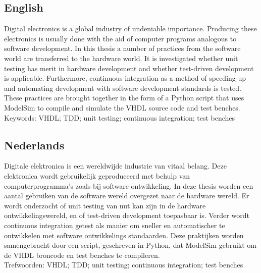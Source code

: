 \documentclass[11pt,british]{article}
\begin{document}
\subsection*{English}
Digital electronics is a global industry of undeniable importance. Producing these electronics is usually done with the aid of computer programs analogous to software development. In this thesis a number of practices from the software world are transferred to the hardware world. It is investigated whether unit testing has merit in hardware development and whether test-driven development is applicable. Furthermore, continuous integration as a method of speeding up and automating development with software development standards is tested. These practices are brought together in the form of a Python script that uses ModelSim to compile and simulate the VHDL source code and test benches.
\\[\baselineskip]
Keywords: VHDL; TDD; unit testing; continuous integration; test benches
\\[2\baselineskip]

\subsection*{Nederlands}
Digitale elektronica is een wereldwijde industrie van vitaal belang. Deze elektronica wordt gebruikelijk geproduceerd met behulp van computerprogramma's zoals bij software ontwikkeling. In deze thesis worden een aantal gebruiken van de software wereld overgezet naar de hardware wereld. Er wordt onderzocht of unit testing van nut kan zijn in de hardware ontwikkelingswereld, en of test-driven development toepasbaar is. Verder wordt continuous integration getest als manier om sneller en automatischer te ontwikkelen met software ontwikkelings standaarden. Deze praktijken worden samengebracht door een script, geschreven in Python, dat ModelSim gebruikt om de VHDL broncode en test benches te compileren.
\\[\baselineskip]
Trefwoorden: VHDL; TDD; unit testing; continuous integration; test benches

\end{document}
